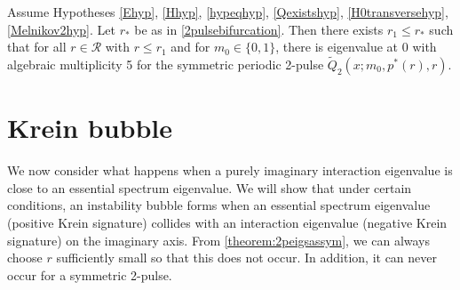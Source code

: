 \documentclass[thesis.tex]{subfiles}
\begin{document}
\begin{theorem}\label{theorem:2peigssym}
Assume Hypotheses \ref{Ehyp}, \ref{Hhyp}, \ref{hypeqhyp}, \ref{Qexistshyp}, \ref{H0transversehyp}, \ref{Melnikov2hyp}. Let $r_*$ be as in \cref{2pulsebifurcation}. Then there exists $r_1 \leq r_*$ such that for all $r \in \mathcal{R}$ with $r \leq r_1$ and for $m_0 \in \{0, 1\}$, there is eigenvalue at 0 with algebraic multiplicity 5 for the symmetric periodic 2-pulse $\tilde{Q}_2(x; m_0, p^*(r), r)$.
\end{theorem}

\section{Krein bubble}

We now consider what happens when a purely imaginary interaction eigenvalue is close to an essential spectrum eigenvalue. We will show that under certain conditions, an instability bubble forms when an essential spectrum eigenvalue (positive Krein signature) collides with an interaction eigenvalue (negative Krein signature) on the imaginary axis. From \cref{theorem:2peigsassym}, we can always choose $r$ sufficiently small so that this does not occur. In addition, it can never occur for a symmetric 2-pulse. 
\end{document}
